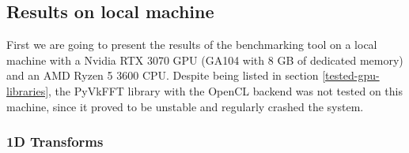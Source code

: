 \documentclass[english,11pt,a4paper,table]{article} %
\begin{document}
\begin{comment}
To streamline the setup of the necessary environment and to provide a path for reproducible testing separate docker containers for the individual tested packages could be created.
This ensures that the benchmarking tool can be set-up and run on any machine with a working docker installation (given a present GPU compatible with the respective library).
This is especially important for GPU-accelerated libraries, since they are often very sensitive to the CUDA driver versions and Python versions (Python packages, which target CUDA are built and linked against a specific version of the CUDA toolkit).
In such a setup the host system only needs to have a working docker installation and the necessary drivers for the GPU, while the docker container contains the remaining parts of the stack (the CUDA toolkit, the profiler, the Python interpreter, the Python packages and the code to generate and execute the test cases).
This allows one to easily test different combinations of CUDA toolkit versions, Python versions and Python packages without having to install them on the host system (conda environments and Python virtual environments provide similar functionality, but docker containers provide even more possibilities for encapsulation).
A recent CUDA driver can support multiple major CUDA toolkit versions, as seen in the tables provided by Nvidia \cite{cudacompat}.
This technique of containerization is enabled by the Nvidia Container Runtime, which is a docker runtime that allows the execution of docker containers with GPU support \cite{container-runtime}.
AMD also provides similar solutions to support GPU-accelerated docker containers \cite{rocm-docker}.
\end{comment}

\subsection{Results on local machine}

First we are going to present the results of the benchmarking tool on a local machine with a Nvidia RTX 3070 GPU (GA104 with 8 GB of dedicated memory) and an AMD Ryzen 5 3600 CPU.
Despite being listed in section \ref{tested-gpu-libraries}, the PyVkFFT library with the OpenCL backend was not tested on this machine, since it proved to be unstable and regularly crashed the system.

\subsubsection{1D Transforms}
\label{1d_transforms}
\end{document}

